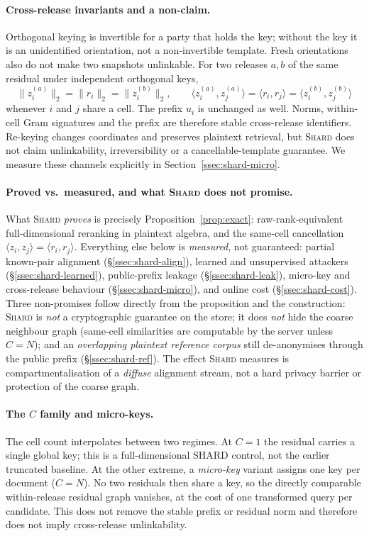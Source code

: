 \documentclass[11pt,a4paper]{article}
\begin{document}
\paragraph{Cross-release invariants and a non-claim.} Orthogonal keying is
invertible for a party that holds the key; without the key it is an
unidentified orientation, not a non-invertible template. Fresh orientations
also do not make two snapshots unlinkable. For two releases $a,b$ of the same
residual under independent orthogonal keys,
\[
\|z_i^{(a)}\|_2=\|r_i\|_2=\|z_i^{(b)}\|_2,
\qquad
\langle z_i^{(a)},z_j^{(a)}\rangle
=\langle r_i,r_j\rangle
=\langle z_i^{(b)},z_j^{(b)}\rangle
\]
whenever $i$ and $j$ share a cell. The prefix $u_i$ is unchanged as well.
Norms, within-cell Gram signatures and the prefix are therefore stable
cross-release identifiers. Re-keying changes coordinates and preserves
plaintext retrieval, but \textsc{Shard} does not claim unlinkability,
irreversibility or a cancellable-template guarantee. We measure these
channels explicitly in Section~\ref{ssec:shard-micro}.

\paragraph{Proved vs.\ measured, and what \textsc{Shard} does not promise.}
What \textsc{Shard} \emph{proves} is precisely Proposition~\ref{prop:exact}:
raw-rank-equivalent full-dimensional reranking in plaintext algebra, and the same-cell cancellation
$\langle z_i,z_j\rangle=\langle r_i,r_j\rangle$. Everything else below is
\emph{measured}, not guaranteed: partial known-pair alignment
(\S\ref{ssec:shard-align}), learned and unsupervised attackers
(\S\ref{ssec:shard-learned}), public-prefix leakage
(\S\ref{ssec:shard-leak}), micro-key and cross-release behaviour
(\S\ref{ssec:shard-micro}), and online cost
(\S\ref{ssec:shard-cost}). Three non-promises follow directly from the
proposition and the construction: \textsc{Shard} is \emph{not} a cryptographic
guarantee on the store; it does \emph{not} hide the coarse neighbour graph
(same-cell similarities are computable by the server unless $C{=}N$); and an
\emph{overlapping plaintext reference corpus} still de-anonymises through the
public prefix (\S\ref{ssec:shard-ref}). The effect \textsc{Shard} measures is
compartmentalisation of a \emph{diffuse} alignment stream, not a hard privacy
barrier or protection of the coarse graph.

\paragraph{The $C$ family and micro-keys.} The cell count interpolates
between two regimes. At $C{=}1$ the residual carries a single global key;
this is a full-dimensional SHARD control, not the earlier truncated baseline.
At the other extreme, a \emph{micro-key} variant assigns one key per
document ($C{=}N$). No two residuals then share a key, so the directly
comparable within-release residual graph vanishes, at the cost of one
transformed query per candidate. This does not remove the stable prefix or
residual norm and therefore does not imply cross-release unlinkability.
\end{document}
